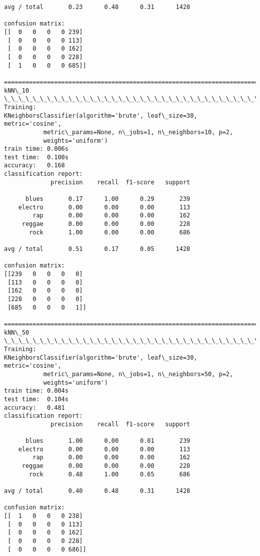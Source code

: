 \documentclass[11pt]{article}
\begin{document}
\begin{Verbatim}[commandchars=\\\{\}]
avg / total       0.23      0.48      0.31      1428

confusion matrix:
[[  0   0   0   0 239]
 [  0   0   0   0 113]
 [  0   0   0   0 162]
 [  0   0   0   0 228]
 [  1   0   0   0 685]]

================================================================================
kNN\_10
\_\_\_\_\_\_\_\_\_\_\_\_\_\_\_\_\_\_\_\_\_\_\_\_\_\_\_\_\_\_\_\_\_\_\_\_\_\_\_\_\_\_\_\_\_\_\_\_\_\_\_\_\_\_\_\_\_\_\_\_\_\_\_\_\_\_\_\_\_\_\_\_\_\_\_\_\_\_\_\_
Training: 
KNeighborsClassifier(algorithm='brute', leaf\_size=30, metric='cosine',
           metric\_params=None, n\_jobs=1, n\_neighbors=10, p=2,
           weights='uniform')
train time: 0.006s
test time:  0.100s
accuracy:   0.168
classification report:
             precision    recall  f1-score   support

      blues       0.17      1.00      0.29       239
    electro       0.00      0.00      0.00       113
        rap       0.00      0.00      0.00       162
     reggae       0.00      0.00      0.00       228
       rock       1.00      0.00      0.00       686

avg / total       0.51      0.17      0.05      1428

confusion matrix:
[[239   0   0   0   0]
 [113   0   0   0   0]
 [162   0   0   0   0]
 [228   0   0   0   0]
 [685   0   0   0   1]]

================================================================================
kNN\_50
\_\_\_\_\_\_\_\_\_\_\_\_\_\_\_\_\_\_\_\_\_\_\_\_\_\_\_\_\_\_\_\_\_\_\_\_\_\_\_\_\_\_\_\_\_\_\_\_\_\_\_\_\_\_\_\_\_\_\_\_\_\_\_\_\_\_\_\_\_\_\_\_\_\_\_\_\_\_\_\_
Training: 
KNeighborsClassifier(algorithm='brute', leaf\_size=30, metric='cosine',
           metric\_params=None, n\_jobs=1, n\_neighbors=50, p=2,
           weights='uniform')
train time: 0.004s
test time:  0.104s
accuracy:   0.481
classification report:
             precision    recall  f1-score   support

      blues       1.00      0.00      0.01       239
    electro       0.00      0.00      0.00       113
        rap       0.00      0.00      0.00       162
     reggae       0.00      0.00      0.00       228
       rock       0.48      1.00      0.65       686

avg / total       0.40      0.48      0.31      1428

confusion matrix:
[[  1   0   0   0 238]
 [  0   0   0   0 113]
 [  0   0   0   0 162]
 [  0   0   0   0 228]
 [  0   0   0   0 686]]


\end{Verbatim}
\end{document}
